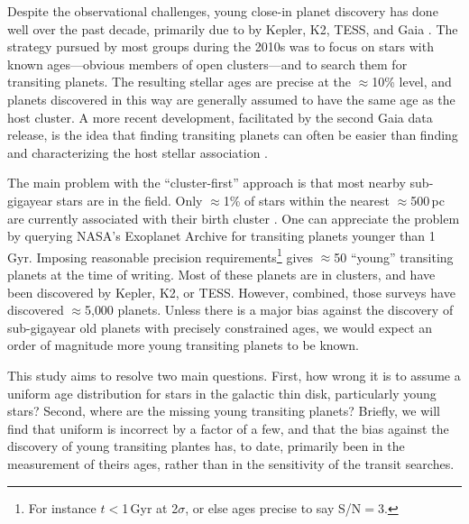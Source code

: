 \documentclass[11pt,twocolumn,tighten]{aastex63}
\begin{document}
Despite the observational challenges, young close-in planet discovery
has done well over the past decade, primarily due to
by Kepler, K2, TESS, and Gaia
\citep[e.g.][]{Meibom_2013,Mann_K2_25_2016,Mann_2017,Curtis_2018,Livingston_2018,David_2019,Bouma_2020_toi837,Rizzuto_2020,Plavchan_2020,Newton_2021,Nardiello_2022,Tofflemire_2021,Barber_2022,Bouma_2022a,Bouma_2022b,Zhou_2022,Zakhozhay_2022,Wood_2023}.
The strategy pursued by most groups during the 2010s was to focus on
stars with known ages---obvious members of open clusters---and to
search them for transiting planets.  The resulting stellar ages are
precise at the $\approx$10\% level, and planets discovered in this way
are generally assumed to have the same age as the host cluster.  A
more recent development, facilitated by the second Gaia data release,
is the idea that finding transiting planets can often be easier than
finding and characterizing the host stellar association
\citep[e.g.][]{Tofflemire_2021}.

The main problem with the ``cluster-first'' approach is that most
nearby sub-gigayear stars are in the field.  Only $\approx$1\% of
stars within the nearest $\approx$500\,pc are currently associated
with their birth cluster
\citep[e.g.][]{Zari_2018,CantatGaudin_2020,Kounkel_2020,Kerr_2021}.
One can appreciate the problem by querying NASA's Exoplanet Archive
\citep[NEA;][]{2013PASP..125..989A} for transiting planets younger
than 1\,Gyr.  Imposing reasonable precision requirements\footnote{For
instance $t$$<$1\,Gyr at 2$\sigma$, or else ages precise to say
S/N$=$3.} gives $\approx$50 ``young'' transiting planets at the time
of writing.  Most of these planets are in clusters, and have been
discovered by Kepler, K2, or TESS.  However, combined, those surveys
have discovered $\approx$5{,}000 planets.  Unless there is a major
bias against the discovery of sub-gigayear old planets with precisely
constrained ages, we would expect an order of magnitude more young
transiting planets to be known.

This study aims to resolve two main questions.  First, how wrong it is
to assume a uniform age distribution for stars in the galactic thin
disk, particularly young stars?  Second, where are the missing young
transiting planets?  Briefly, we will find that uniform is incorrect
by a factor of a few, and that the bias against the discovery of young
transiting plantes has, to date, primarily been in the measurement of
theirs ages, rather than in the sensitivity of the transit searches.
\end{document}
